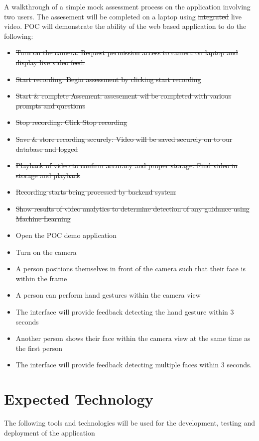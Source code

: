 \documentclass{article}
\begin{document}
A walkthrough of a simple mock assessment process on the application involving two users. The assesement will be completed on a laptop using \color{red}\sout{integrated }\color{black} live video. POC will demonstrate the ability of the web based application to do the following: \\
\begin{itemize}\color{red}
  \item \sout{Turn on the camera: Request permission access to camera on laptop and display live video feed.}
  \item \sout{Start recording: Begin assessment by clicking start recording}
  \item \sout{Start \& complete Assement: assesement wil be completed with various prompts and questions}
  \item \sout{Stop recording: Click Stop recording}
  \item \sout{Save \& store recording securely: Video will be saved securely on to our database and logged}
  \item \sout{Playback of video to confirm accuracy and proper storage: Find video in storage and playback}
  \item \sout{Recording starts being processed by backend system}
  \item \sout{Show results of video analytics to determine detection of any guidance using Machine Learning}\color{black}
  \item Open the POC demo application
  \item Turn on the camera
  \item A person positions themselves in front of the camera such that their face is within the frame
  \item A person can perform hand gestures within the camera view
  \item The interface will provide feedback detecting the hand gesture within 3 seconds
  \item Another person shows their face within the camera view at the same time as the first person
  \item The interface will provide feedback detecting multiple faces within 3 seconds.
\end{itemize}


\section{Expected Technology}

The following tools and technologies will be used for the development, testing and deployment of the application 
\end{document}
